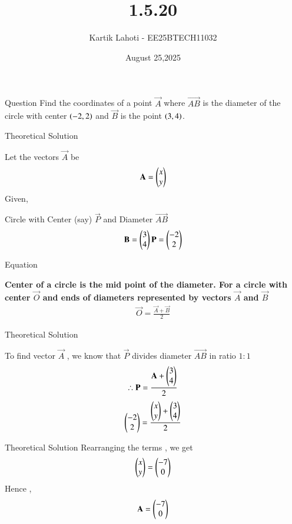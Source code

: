 \documentclass{beamer}
\title %
{1.5.20}
\date{August 25,2025}
\author 
{Kartik Lahoti - EE25BTECH11032}
\begin{document}
\frame{\titlepage}
\begin{frame}{Question}
Find the coordinates of a point $\vec{A}$ where $\vec{AB}$ is the diameter of the circle with center $\left(-2,2 \right)$ and $\vec{B}$ is the point $\left(3,4\right)$.
\end{frame}



\begin{frame}{Theoretical Solution}

Let the vectors $\vec{A}$  be 
\begin{align}
    \mathbf{A}=\begin{pmatrix}x\\y\end{pmatrix} 
\end{align}
Given,

Circle with Center (say) $\vec{P}$ and
Diameter $\vec{AB}$ 
\begin{align}
    \mathbf{B}=\begin{pmatrix}3\\4\end{pmatrix} \mathbf{P} = \begin{pmatrix}-2\\2\end{pmatrix}
\end{align}

\end{frame}

\begin{frame}{Equation}

\textbf{Center of a circle is the mid point of the diameter. For a circle with center $\vec{O}$ and ends of diameters represented by vectors $\vec{A}$ and $\vec{B}$  }
\begin{align}
    \vec{O}=\frac{\vec{A}+\vec{B}}{2}
\end{align}

\end{frame}

\begin{frame}{Theoretical Solution}

To find vector $\vec{A}$ , we know that $\vec{P}$ divides diameter $\vec{AB}$ in ratio $1\colon1$
\begin{align}
    \therefore \mathbf{P} = \frac{\mathbf{A} + \begin{pmatrix}3\\4\end{pmatrix}  }{2} 
\end{align}
\begin{align}
    \begin{pmatrix}-2\\2\end{pmatrix} = \frac{\begin{pmatrix}x\\y\end{pmatrix} + \begin{pmatrix}3\\4\end{pmatrix}}{2}    
\end{align}

\end{frame}

\begin{frame}{Theoretical Solution}
Rearranging the terms , we get  
\begin{align}
    \begin{pmatrix}x\\y\end{pmatrix} = \begin{pmatrix}-7\\0\end{pmatrix} 
\end{align}
Hence , 
\begin{align}
    \mathbf{A} = \begin{pmatrix}-7\\0\end{pmatrix}
\end{align}

\end{frame}
\end{document}
